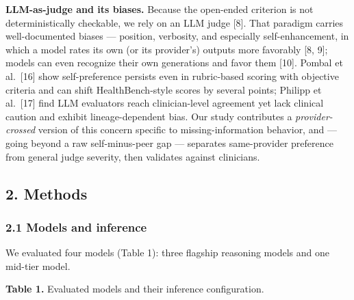 \documentclass[
  11pt,
]{article}
\begin{document}
\textbf{LLM-as-judge and its biases.} Because the open-ended criterion
is not deterministically checkable, we rely on an LLM judge {[}8{]}.
That paradigm carries well-documented biases --- position, verbosity,
and especially self-enhancement, in which a model rates its own (or its
provider's) outputs more favorably {[}8, 9{]}; models can even recognize
their own generations and favor them {[}10{]}. Pombal et al.~{[}16{]}
show self-preference persists even in rubric-based scoring with
objective criteria and can shift HealthBench-style scores by several
points; Philipp et al.~{[}17{]} find LLM evaluators reach
clinician-level agreement yet lack clinical caution and exhibit
lineage-dependent bias. Our study contributes a \emph{provider-crossed}
version of this concern specific to missing-information behavior, and
--- going beyond a raw self-minus-peer gap --- separates same-provider
preference from general judge severity, then validates against
clinicians.

\subsection{2. Methods}\label{methods}

\subsubsection{2.1 Models and inference}\label{models-and-inference}

We evaluated four models (Table 1): three flagship reasoning models and
one mid-tier model.

\textbf{Table 1.} Evaluated models and their inference configuration.
\end{document}
